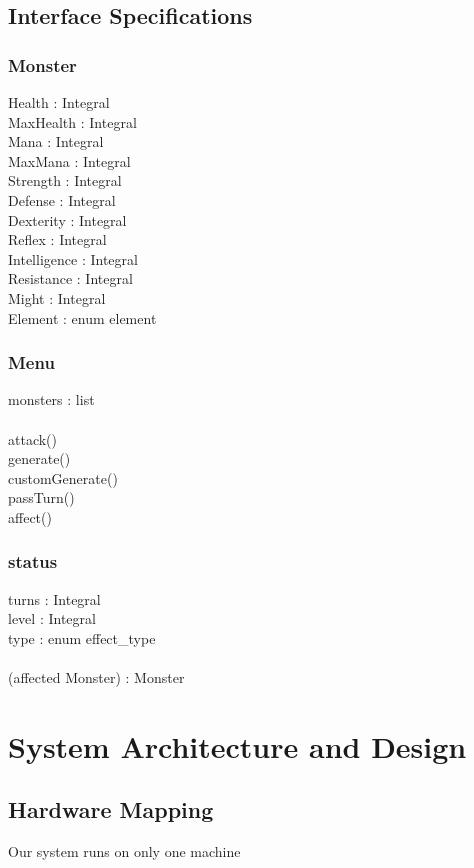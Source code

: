 \documentclass[letterpaper,12pt]{article}
\begin{document}
\subsection{Interface Specifications}
\subsubsection{Monster}
\hrulefill
Health : Integral\\
MaxHealth : Integral\\
Mana : Integral\\
MaxMana : Integral\\
Strength : Integral\\
Defense : Integral\\
Dexterity : Integral\\
Reflex : Integral\\
Intelligence : Integral\\
Resistance : Integral\\
Might : Integral\\
Element : enum element\\
\subsubsection{Menu}
monsters : list\\
\hrulefill\\
attack()\\
generate()\\
customGenerate()\\
passTurn()\\
affect()\\
\subsubsection{status}
turns : Integral\\
level : Integral\\
type : enum effect\_type\\
\hrulefill\\
(affected Monster) : Monster\\
\section{System Architecture and Design}
\subsection{Hardware Mapping}
Our system runs on only one machine
\end{document}
